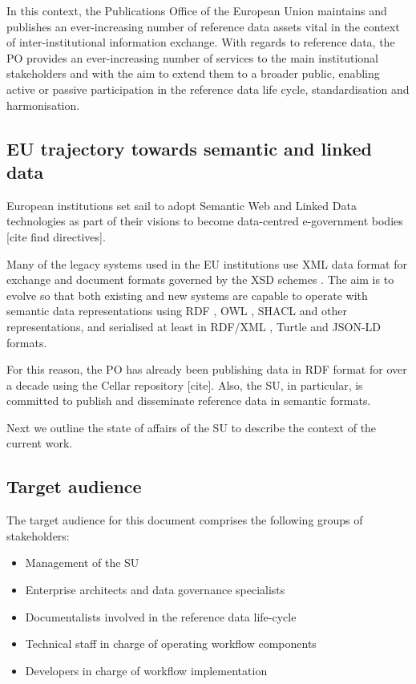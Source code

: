 	In this context, the Publications Office of the European Union maintains and publishes an ever-increasing number of reference data assets vital in the context of inter-institutional information exchange. With regards to reference data, the PO provides an ever-increasing number of services to the main institutional stakeholders and with the aim to extend them to a broader public, enabling active or passive participation in the reference data life cycle, standardisation and harmonisation.

	\subsection{EU trajectory towards semantic and linked data}
	
	European institutions set sail to adopt Semantic Web and Linked Data technologies as part of their visions to become data-centred e-government bodies [cite find directives]. 
	
	Many of the legacy systems used in the EU institutions use XML data format for exchange and document formats governed by the XSD schemes \citep{xsd1.1-spec}. The aim is to evolve so that both existing and new systems are capable to operate with semantic data representations using RDF \citep{rdf11}, OWL \citep{owl2.0,owl2}, SHACL \citep{shacl-spec} and other representations, and serialised at least in RDF/XML \citep{rdf-xml-Beckett:04:RSS,rdf-xml-Schreiber:14:RXS}, Turtle \citep{turtle-Carothers:14:RT} and JSON-LD \citep{spornyjson,sporny2014json} formats.
	
	For this reason, the PO has already been publishing data in RDF format for over a decade using the Cellar repository [cite]. Also, the SU, in particular, is committed to publish and disseminate reference data in semantic formats. 
	
	Next we outline the state of affairs of the SU to describe the context of the current work. 
	
	\subsection{Target audience}
	\label{sec:audience}
	The target audience for this document comprises the following groups of stakeholders:	

	\begin{itemize}
		\item Management of the SU
		\item Enterprise architects and data governance specialists
		\item Documentalists involved in the reference data life-cycle
		\item Technical staff in charge of operating workflow components
		\item Developers in charge of workflow implementation		
	\end{itemize}	
	
